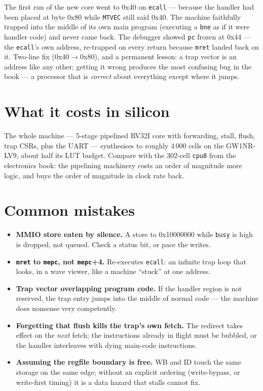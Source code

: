 \begin{example}
The first run of the new core went to 0x40 on \texttt{ecall} ---
because the handler had been placed at byte 0x80 while
\texttt{MTVEC} still said 0x40. The machine faithfully trapped
into the middle of its own main program (executing a \texttt{bne}
as if it were handler code) and never came back. The debugger showed
\texttt{pc} frozen at 0x44 --- the \texttt{ecall}'s own address,
re-trapped on every return because \texttt{mret} landed back on it.
Two-line fix (0x40$\to$0x80), and a permanent lesson: a trap
vector is an address like any other; getting it wrong produces the
most confusing bug in the book --- a processor that is \emph{correct}
about everything except where it jumps.
\end{example}

\section{What it costs in silicon}
\label{sec:synth08}



The whole machine --- 5-stage pipelined RV32I core with forwarding,
stall, flush, trap CSRs, plus the UART --- synthesises to roughly
4\,000 cells on the GW1NR-LV9, about half its LUT budget. Compare
with the 302-cell \texttt{cpu8} from the electronics book: the
pipelining machinery costs an order of magnitude more logic, and buys
the order of magnitude in clock rate back.

\section{Common mistakes}
\label{sec:mistakes08}

\begin{itemize}
\item \textbf{MMIO store eaten by silence.} A store to
      0x10000000 while \texttt{busy} is high is dropped, not
      queued. Check a status bit, or pace the writes.
\item \textbf{\texttt{mret} to \texttt{mepc}, not \texttt{mepc}+4.}
      Re-executes \texttt{ecall}: an infinite trap loop that looks,
      in a wave viewer, like a machine ``stuck'' at one address.
\item \textbf{Trap vector overlapping program code.} If the handler
      region is not reserved, the trap entry jumps into the middle
      of normal code --- the machine does nonsense very competently.
\item \textbf{Forgetting that flush kills the trap's own fetch.} The
      redirect takes effect on the \emph{next} fetch; the
      instructions already in flight must be bubbled, or the handler
      interleaves with dying main-code instructions.
\item \textbf{Assuming the regfile boundary is free.} WB and ID
      touch the same storage on the same edge; without an explicit
      ordering (write-bypass, or write-first timing) it is a
      data hazard that stalls cannot fix.
\end{itemize}

